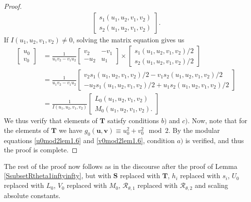 \documentclass[12pt]{amsart}
\newcommand{\1}{\mathmybb{1}}
\begin{document}
\begin{proof}
\begin{align*}
\begin{bmatrix}
s_{1}(u_{1},u_{2},v_{1},v_{2})\\
s_{2}(u_{1},u_{2},v_{1},v_{2})
\end{bmatrix}
.
\end{align*}
If $I(u_{1},u_{2},v_{1},v_{2}) \neq 0$, solving the matrix equation gives us
\begin{align*}
\begin{bmatrix}
u_{0}\\
v_{0}
\end{bmatrix}
&= \frac{1}{u_{1}v_{2}-v_{1}u_{2}}
\begin{bmatrix}
v_{2} & -v_{1}\\
-u_{2} & u_{1}
\end{bmatrix}
\times
\begin{bmatrix}
s_{1}(u_{1},u_{2},v_{1},v_{2})/2\\
s_{2}(u_{1},u_{2},v_{1},v_{2})/2
\end{bmatrix}
\\
&= \frac{1}{u_{1}v_{2}-v_{1}u_{2}}
\begin{bmatrix}
v_{2} s_{1}(u_{1},u_{2},v_{1},v_{2})/2 - v_{1} s_{2}(u_{1},u_{2},v_{1},v_{2})/2 \\
-u_{2} s_{1}(u_{1},u_{2},v_{1},v_{2})/2 +u_{1}s_{2}(u_{1},u_{2},v_{1},v_{2})/2
\end{bmatrix}\\
&=\frac{1}{I(u_{1},u_{2},v_{1},v_{2})}
\begin{bmatrix}
L_{0}(u_{1},u_{2},v_{1},v_{2})\\
M_{0}(u_{1},u_{2},v_{1},v_{2}).
\end{bmatrix}
\end{align*}
We thus verify that elements of $\mathbf{T}$ satisfy conditions $b)$ and $c)$. Now, note that for the elements of $\mathbf{T}$ we have $g_{0}(\mathbf{u},\mathbf{v}) \equiv u_{0}^2+v_{0}^2 \mod 2$. By the modular equations \eqref{u0mod2lem1.6} and \eqref{v0mod2lem1.6}, condition $a)$ is verified, and thus the proof is complete.
\end{proof}
The rest of the proof now follows as in the discourse after the proof of Lemma \ref{SsubsetRtheta1inftyinfty}, but with $\mathbf{S}$ replaced with $\mathbf{T}$, $h_{i}$ replaced with $s_{i}$, $U_{0}$ replaced with $L_{0}$, $V_{0}$ replaced with $M_{0}$, $\mathcal{R}_{\theta,1}$ replaced with $\mathcal{R}_{\theta,2}$ and scaling absolute constants.
\end{document}
